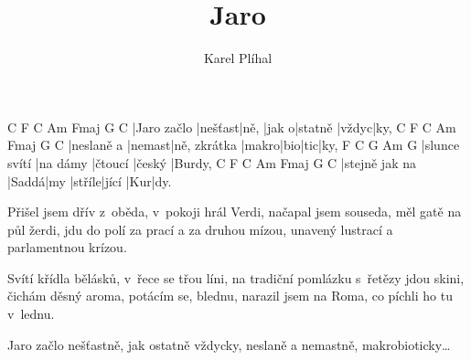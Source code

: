 \documentclass{song}
\author{Karel Plíhal}
\title{Jaro}
\begin{document}
\strophe
C           F       C    Am    Fmaj\7  G     C
|Jaro začlo |nešťast|ně, |jak o|statně |vždyc|ky,
C          F      C            Am    Fmaj\7 G C
|neslaně a |nemast|ně, zkrátka |makro|bio|tic|ky,
F             C        G       Am\7   G
|slunce svítí |na dámy |čtoucí |český |Burdy,
C              F     C   Am     Fmaj\7 G  C
|stejně jak na |Saddá|my |stříle|jící |Kur|dy. 
\endstrophe

\strophe*
Přišel jsem dřív z~oběda, v~pokoji hrál Verdi, 
načapal jsem souseda, měl gatě na půl žerdi, 
jdu do polí za prací a za druhou mízou, 
unavený lustrací a parlamentnou krízou.
\endstrophe

\strophe*
Svítí křídla bělásků, v~řece se třou líni, 
na tradiční pomlázku s~řetězy jdou skini, 
čichám děsný aroma, potácím se, blednu, 
narazil jsem na Roma, co píchli ho tu v~lednu. 
\endstrophe

\strophe*
Jaro začlo nešťastně, jak ostatně vždycky,
neslaně a nemastně, makrobioticky\ldots
\endstrophe
\end{document}
